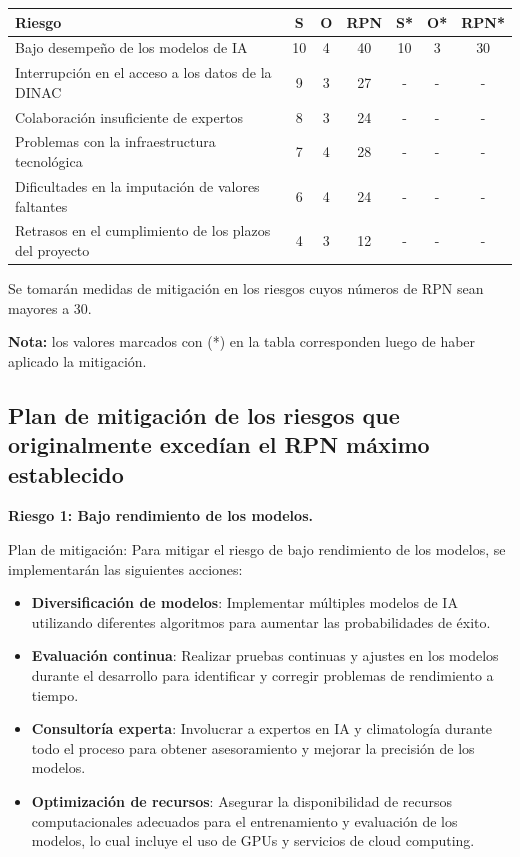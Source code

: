 \documentclass[
11pt, %
codirector, %
]{charter}
\begin{document}
\begin{table}[htpb]
\centering
\begin{tabularx}{\linewidth}{@{}|X|c|c|c|c|c|c|@{}}
\hline
\rowcolor[HTML]{C0C0C0} 
Riesgo & S & O & RPN & S* & O* & RPN* \\ \hline
Bajo desempeño de los modelos de IA & 10 & 4 & 40 & 10 & 3 & 30 \\ \hline
Interrupción en el acceso a los datos de la DINAC & 9 & 3 & 27 & - & - & - \\ \hline
Colaboración insuficiente de expertos & 8 & 3 & 24 & - & - & - \\ \hline
Problemas con la infraestructura tecnológica & 7 & 4 & 28 & - & - & - \\ \hline
Dificultades en la imputación de valores faltantes & 6 & 4 & 24 & - & - & - \\ \hline
Retrasos en el cumplimiento de los plazos del proyecto & 4 & 3 & 12 & - & - & - \\ \hline
\end{tabularx}%
\end{table}

Se tomarán medidas de mitigación en los riesgos cuyos números de RPN sean mayores a 30.

\textbf{Nota:} los valores marcados con (*) en la tabla corresponden luego de haber aplicado la mitigación.

\subsection{Plan de mitigación de los riesgos que originalmente excedían el RPN máximo establecido}

\textbf{Riesgo 1: Bajo rendimiento de los modelos.}

Plan de mitigación:
Para mitigar el riesgo de bajo rendimiento de los modelos, se implementarán las siguientes acciones:
\begin{itemize}
    \item \textbf{Diversificación de modelos}: Implementar múltiples modelos de IA utilizando diferentes algoritmos para aumentar las probabilidades de éxito.
    \item \textbf{Evaluación continua}: Realizar pruebas continuas y ajustes en los modelos durante el desarrollo para identificar y corregir problemas de rendimiento a tiempo.
    \item \textbf{Consultoría experta}: Involucrar a expertos en IA y climatología durante todo el proceso para obtener asesoramiento y mejorar la precisión de los modelos.
    \item \textbf{Optimización de recursos}: Asegurar la disponibilidad de recursos computacionales adecuados para el entrenamiento y evaluación de los modelos, lo cual incluye el uso de GPUs y servicios de cloud computing.
\end{itemize}
\end{document}
